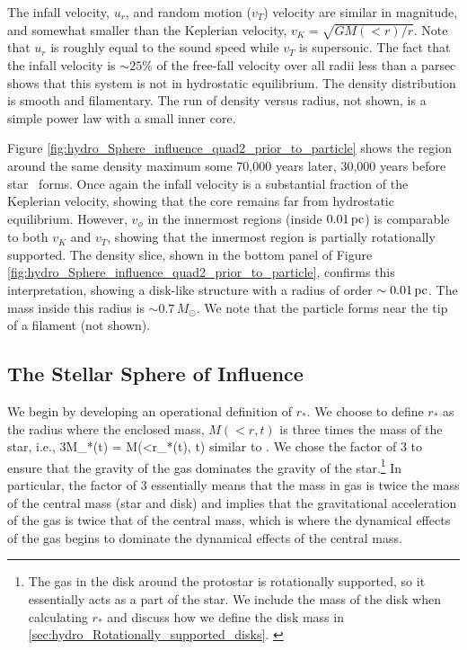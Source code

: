 \documentclass[../dissertation.tex]{subfiles}
\begin{document}
The infall velocity, $u_r$, and random motion ($v_T$) %
 velocity are similar in magnitude, and 
somewhat smaller than the Keplerian velocity, $v_K = \sqrt{GM(<r) /r}$.
Note that $u_r$ is roughly equal to the sound speed while $v_T$ is supersonic.
The fact that the infall velocity is $\sim 25\%$ of the free-fall velocity 
over all radii less than a parsec shows that this system is not in hydrostatic equilibrium.
The density distribution is smooth and filamentary.
The run of density versus radius, not shown, is a simple power law with a small inner core.

Figure \ref{fig:hydro_Sphere_influence_quad2_prior_to_particle} shows the region 
around the same density maximum some 70,000 years later, 30,000 years before 
star \partA\ forms.
Once again the infall velocity is a substantial fraction of the Keplerian velocity, 
showing that the core remains far from hydrostatic equilibrium.
However, $v_{\phi}$ in the innermost regions (inside $0.01\,\rm pc$) is 
comparable to both $v_K$ and $v_T$, showing that the innermost 
region is partially rotationally supported. The density slice, shown in the bottom 
panel of Figure \ref{fig:hydro_Sphere_influence_quad2_prior_to_particle}, confirms this  
interpretation, showing a disk-like structure with a radius of order $\sim 0.01 \,\rm pc$. 
The mass inside this radius is $\sim 0.7\,M_\odot$.
We note that the particle forms near the tip of a filament (not shown).


\subsection{The Stellar Sphere of Influence} \label{sec:hydro_r_star}
We begin by developing an operational definition of $r_*$. 
We choose to define $r_*$ as the radius where the enclosed mass, $M(<r, t)$ is three times the mass 
of the star, i.e., 
%
\be
3M_*(t) = M(<r_*(t), t)
\label{eq:hydro_rstar def}
\ee
%
similar to \citet{2015ApJ...804...44M}. 
We chose the factor of 3 to ensure that the gravity of the gas dominates the gravity 
of the star.\footnote{
The gas in the disk around the protostar is rotationally supported, so 
it essentially acts as a part of the star. We include the mass of the disk 
when calculating $r_*$ and discuss how we define the disk mass in 
\ref{sec:hydro_Rotationally_supported_disks}. \label{footnote:disk_mass}}
In particular, the factor of 3 essentially means that the mass in gas is twice the mass of the central mass (star and disk) and implies that the gravitational acceleration of the gas is twice that of the central mass, which is where the dynamical effects of the gas begins to dominate the dynamical effects of the central mass.
\end{document}
